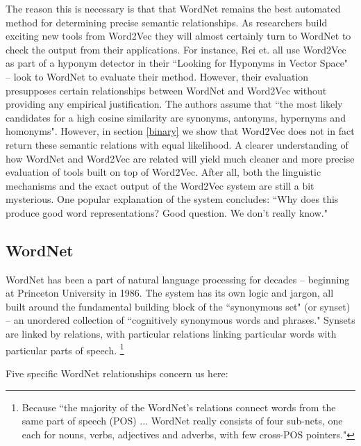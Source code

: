 \documentclass{article}
\begin{document}
The reason this is necessary is that that WordNet remains the best automated method for determining precise semantic relationships. As researchers build exciting new tools from Word2Vec they will almost certainly turn to WordNet to check the output from their applications. For instance, Rei et. all \cite{rei2014looking} use Word2Vec as part of a hyponym detector in their ``Looking for Hyponyms in Vector Space" -- look to WordNet to evaluate their method. However, their evaluation presupposes certain relationships between WordNet and Word2Vec without providing any empirical justification. The authors assume that ``the most likely candidates for a high cosine similarity are synonyms, antonyms, hypernyms and homonyms". However, in section \ref{binary} we show that Word2Vec does not in fact return these semantic relations with equal likelihood. A clearer understanding of how WordNet and Word2Vec are related will yield much cleaner and more precise evaluation of tools built on top of Word2Vec. After all, both the linguistic mechanisms and the exact output of the Word2Vec system are still a bit mysterious. One popular explanation of the system concludes: ``Why does this produce good word representations? Good question. We don’t really know." \cite{goldberg2014word2vec}

\subsection{WordNet}  \label{WordNet}
WordNet has been a part of natural language processing for decades -- beginning at Princeton University in 1986. The system has its own logic and jargon, all built around the fundamental building block \cite{wordnet} of the ``synonymous set" (or synset) -- an unordered collection of ``cognitively synonymous words and phrases." \cite{cruse} Synsets are linked by relations, with particular relations linking particular words with particular parts of speech. \footnote{Because ``the majority of the WordNet’s relations connect words from the same part of speech (POS) ... WordNet really consists of four sub-nets, one each for nouns, verbs, adjectives and adverbs, with few cross-POS pointers."\cite{Wordnetwebsite}}

Five specific WordNet relationships concern us here:
\end{document}
